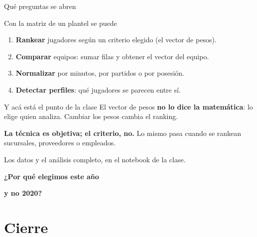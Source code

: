\documentclass[aspectratio=169,10pt]{beamer}
\begin{document}
\begin{frame}{Qué preguntas se abren}

\begin{block}{Con la matriz de un plantel se puede}
\begin{enumerate}
    \item \textbf{Rankear} jugadores según un criterio elegido (el vector de pesos).
    \item \textbf{Comparar} equipos: sumar filas y obtener el vector del equipo.
    \item \textbf{Normalizar} por minutos, por partidos o por posesión.
    \item \textbf{Detectar perfiles}: qué jugadores se parecen entre sí.
\end{enumerate}
\end{block}

\vspace{0.4cm}
\begin{alertblock}{Y acá está el punto de la clase}
El vector de pesos \textbf{no lo dice la matemática}: lo elige quien analiza. Cambiar los pesos
cambia el ranking.

\textbf{La técnica es objetiva; el criterio, no.} Lo mismo pasa cuando se rankean sucursales,
proveedores o empleados.
\end{alertblock}

\vspace{0.2cm}
\begin{center}
\small Los datos y el análisis completo, en el notebook de la clase.
\end{center}
\end{frame}

\begin{frame}[plain]
\vspace{1.6cm}
\begin{center}
{\Huge \textbf{\color{violetaOscuro} ¿Por qué elegimos este año}}

\vspace{0.4cm}
{\Huge \textbf{\color{violetaOscuro} y no 2020?}}
\end{center}
\end{frame}

\section{Cierre}
\end{document}
